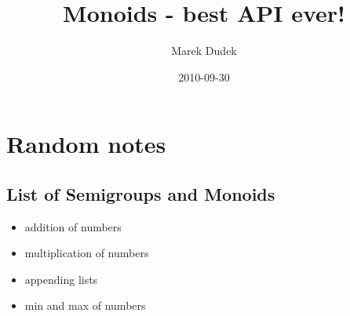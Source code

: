 \documentclass{article}
\title{Monoids - best API ever!}
\date{2010-09-30}
\author{Marek Dudek}
\begin{document}
\maketitle

\newpage
\tableofcontents

\newpage
{}

\section{Random notes}
\subsection{List of Semigroups and Monoids}

\begin{itemize}
    \item addition of numbers
    \item multiplication of numbers
    \item appending lists
    \item min and max of numbers
\end{itemize}
\end{document}
